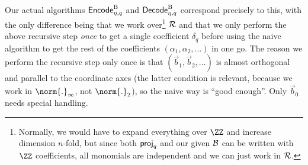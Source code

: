 \begin{remark}
Our actual algorithms $\mathsf{Encode}^{\textup{B}}_{\eta,q}$ and $\mathsf{Decode}^{\textup{B}}_{\eta,q}$ correspond precisely to this, with the only difference being that we work over\footnote{Normally, we would have to expand everything over $\ZZ$ and increase dimension $n$-fold, but since both $\mathsf{proj}_q$ and our given $\mathcal{B}$ can be written with $\ZZ$ coefficients, all monomials are independent and we can just work in $\mathcal{R}$.} $\mathcal{R}$ and that we only perform the above recursive step \emph{once} to get a single coefficient $\delta_q$ before using the naive algorithm to get the rest of the coefficients $(\alpha_1,\alpha_2,\ldots)$ in one go.
The reason we perform the recursive step only once is that $(\vec{b}_1,\vec{b}_2,\ldots)$ is almost orthogonal and parallel to the coordinate axes (the latter condition is relevant, because we work in $\norm{.}_\infty$, not $\norm{.}_2$), so the naive way is ``good enough''.
Only $\vec{b}_0$ needs special handling.
%
%
%
%
%
%
\end{remark}
\fi
